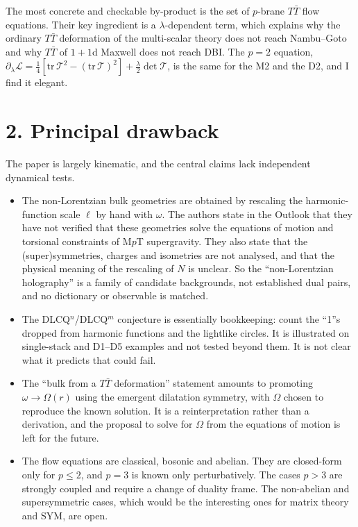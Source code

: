 \documentclass[11pt]{article}
\begin{document}
The most concrete and checkable by-product is the set of $p$-brane $T\bar T$ flow equations. Their key ingredient is a $\lambda$-dependent term, which explains why the ordinary $T\bar T$ deformation of the multi-scalar theory does not reach Nambu--Goto and why $T\bar T$ of $1{+}1$d Maxwell does not reach DBI. The $p=2$ equation, $\partial_\lambda\mathcal L=\tfrac14[\mathrm{tr}\,\mathcal T^2-(\mathrm{tr}\,\mathcal T)^2]+\tfrac{\lambda}{2}\det\mathcal T$, is the same for the M2 and the D2, and I find it elegant.

\section*{2. Principal drawback}
The paper is largely kinematic, and the central claims lack independent dynamical tests.
\begin{itemize}
\item The non-Lorentzian bulk geometries are obtained by rescaling the harmonic-function scale $\ell$ by hand with $\omega$. The authors state in the Outlook that they have not verified that these geometries solve the equations of motion and torsional constraints of M$p$T supergravity. They also state that the (super)symmetries, charges and isometries are not analysed, and that the physical meaning of the rescaling of $N$ is unclear. So the ``non-Lorentzian holography'' is a family of candidate backgrounds, not established dual pairs, and no dictionary or observable is matched.
\item The DLCQ$^n$/DLCQ$^m$ conjecture is essentially bookkeeping: count the ``1''s dropped from harmonic functions and the lightlike circles. It is illustrated on single-stack and D1--D5 examples and not tested beyond them. It is not clear what it predicts that could fail.
\item The ``bulk from a $T\bar T$ deformation'' statement amounts to promoting $\omega\to\Omega(r)$ using the emergent dilatation symmetry, with $\Omega$ chosen to reproduce the known solution. It is a reinterpretation rather than a derivation, and the proposal to solve for $\Omega$ from the equations of motion is left for the future.
\item The flow equations are classical, bosonic and abelian. They are closed-form only for $p\le2$, and $p=3$ is known only perturbatively. The cases $p>3$ are strongly coupled and require a change of duality frame. The non-abelian and supersymmetric cases, which would be the interesting ones for matrix theory and SYM, are open.
\end{itemize}
\end{document}
